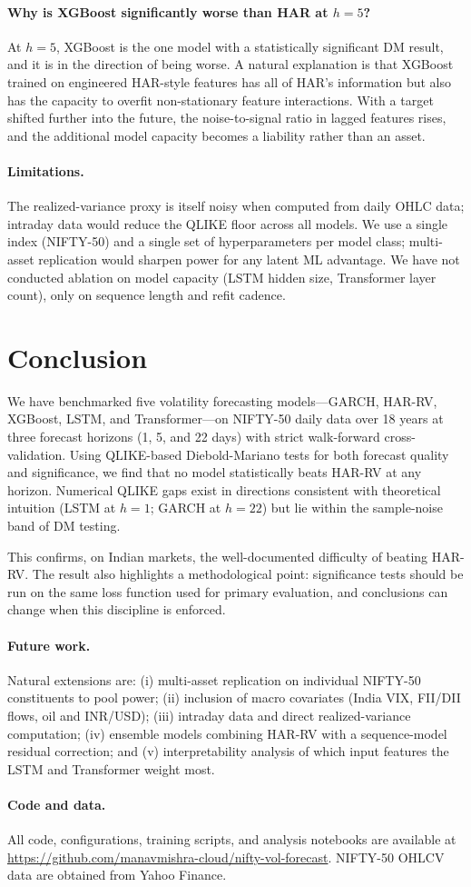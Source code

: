 \documentclass[11pt]{article}
\begin{document}
\paragraph{Why is XGBoost significantly worse than HAR at $h=5$?}
At $h=5$, XGBoost is the one model with a statistically significant
DM result, and it is in the direction of being worse. A natural
explanation is that XGBoost trained on engineered HAR-style features
has all of HAR's information but also has the capacity to overfit
non-stationary feature interactions. With a target shifted further
into the future, the noise-to-signal ratio in lagged features rises,
and the additional model capacity becomes a liability rather than
an asset.

\paragraph{Limitations.}
The realized-variance proxy is itself noisy when computed from daily
OHLC data; intraday data would reduce the QLIKE floor across all
models. We use a single index (NIFTY-50) and a single set of
hyperparameters per model class; multi-asset replication would
sharpen power for any latent ML advantage. We have not conducted
ablation on model capacity (LSTM hidden size, Transformer layer
count), only on sequence length and refit cadence.

\section{Conclusion}
\label{sec:conclusion}

We have benchmarked five volatility forecasting models---GARCH,
HAR-RV, XGBoost, LSTM, and Transformer---on NIFTY-50 daily data
over 18 years at three forecast horizons (1, 5, and 22 days)
with strict walk-forward cross-validation. Using QLIKE-based
Diebold-Mariano tests for both forecast quality and significance,
we find that no model statistically beats HAR-RV at any horizon.
Numerical QLIKE gaps exist in directions consistent with theoretical
intuition (LSTM at $h=1$; GARCH at $h=22$) but lie within the
sample-noise band of DM testing.

This confirms, on Indian markets, the well-documented difficulty
of beating HAR-RV. The result also highlights a methodological
point: significance tests should be run on the same loss function
used for primary evaluation, and conclusions can change when this
discipline is enforced.

\paragraph{Future work.} Natural extensions are: (i) multi-asset
replication on individual NIFTY-50 constituents to pool power;
(ii) inclusion of macro covariates (India VIX, FII/DII flows, oil
and INR/USD); (iii) intraday data and direct realized-variance
computation; (iv) ensemble models combining HAR-RV with a
sequence-model residual correction; and (v) interpretability
analysis of which input features the LSTM and Transformer weight
most.

\paragraph{Code and data.} All code, configurations, training
scripts, and analysis notebooks are available at
\url{https://github.com/manavmishra-cloud/nifty-vol-forecast}.
NIFTY-50 OHLCV data are obtained from Yahoo Finance.



\end{document}
